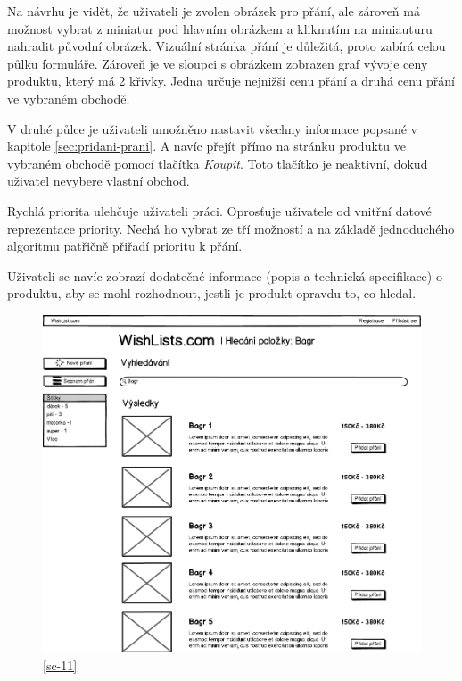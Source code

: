 Na návrhu je vidět, že uživateli je zvolen obrázek pro přání, ale zároveň má možnost vybrat z miniatur pod hlavním obrázkem a kliknutím na miniauturu nahradit původní obrázek. Vizuální stránka přání je důležitá, proto zabírá celou půlku formuláře. Zároveň je ve sloupci s obrázkem zobrazen graf vývoje ceny produktu, který má 2 křivky. Jedna určuje nejnižší cenu přání a druhá cenu přání ve vybraném obchodě.

V druhé půlce je uživateli umožněno nastavit všechny informace popsané v kapitole \ref{sec:pridani-prani}. A navíc přejít přímo na stránku produktu ve vybraném obchodě pomocí tlačítka \emph{Koupit}. Toto tlačítko je neaktivní, dokud uživatel nevybere vlastní obchod.

Rychlá priorita ulehčuje uživateli práci. Oprosťuje uživatele od vnitřní datové reprezentace priority. Nechá ho vybrat ze tří možností a na základě jednoduchého algoritmu patřičně přiřadí prioritu k přání.

Uživateli se navíc zobrazí dodatečné informace (popis a technická specifikace) o produktu, aby se mohl rozhodnout, jestli je produkt opravdu to, co hledal.

\begin{figure}[htb]
\begin{center}
\includegraphics[width=130mm]{./pictures/mock/vysledky-hledani.png}
\caption{\ref{sc-11}}
\label{fig:formular-pridani-prani}
\end{center}
\end{figure}

